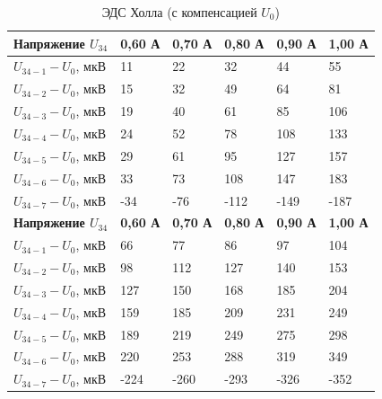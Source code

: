 \documentclass[a4paper, 12pt]{article}
\begin{document}
{\begin{table}[H]
\centering

\label{my-label}
\begin{tabular}{|l|l|l|l|l|l|}
\hline
\textbf{Напряжение $U_{34}$} & \textbf{0,60 А} & \textbf{0,70 А} & \textbf{0,80 А} & \textbf{0,90 А} & \textbf{1,00 А} \\ \hline
$U_{34-1}-U_0$, мкВ          & 11              & 22              & 32              & 44              & 55              \\ \hline
$U_{34-2}-U_0$, мкВ          & 15              & 32              & 49              & 64              & 81              \\ \hline
$U_{34-3}-U_0$, мкВ          & 19              & 40              & 61              & 85              & 106             \\ \hline
$U_{34-4}-U_0$, мкВ          & 24              & 52              & 78              & 108             & 133             \\ \hline
$U_{34-5}-U_0$, мкВ          & 29              & 61              & 95              & 127             & 157             \\ \hline
$U_{34-6}-U_0$, мкВ          & 33              & 73              & 108             & 147             & 183             \\ \hline
$U_{34-7}-U_0$, мкВ          & -34             & -76             & -112            & -149            & -187            \\ \hline
\textbf{Напряжение $U_{34}$} & \textbf{0,60 А} & \textbf{0,70 А} & \textbf{0,80 А} & \textbf{0,90 А} & \textbf{1,00 А} \\ \hline
$U_{34-1}-U_0$, мкВ          & 66              & 77              & 86              & 97              & 104             \\ \hline
$U_{34-2}-U_0$, мкВ          & 98              & 112             & 127             & 140             & 153             \\ \hline
$U_{34-3}-U_0$, мкВ          & 127             & 150             & 168             & 185             & 204             \\ \hline
$U_{34-4}-U_0$, мкВ          & 159             & 185             & 209             & 231             & 249             \\ \hline
$U_{34-5}-U_0$, мкВ          & 189             & 219             & 249             & 275             & 298             \\ \hline
$U_{34-6}-U_0$, мкВ          & 220             & 253             & 288             & 319             & 349             \\ \hline
$U_{34-7}-U_0$, мкВ          & -224            & -260            & -293            & -326            & -352            \\ \hline
\end{tabular}
\caption{ЭДС Холла (с компенсацией $U_0$)}
\end{table}

}
\end{document}
